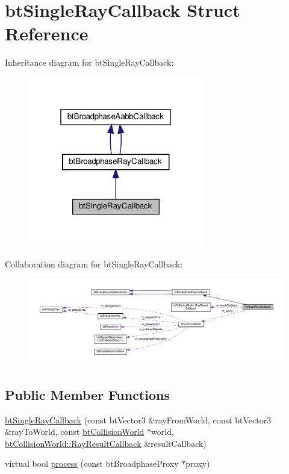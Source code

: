 \hypertarget{structbtSingleRayCallback}{}\section{bt\+Single\+Ray\+Callback Struct Reference}
\label{structbtSingleRayCallback}


Inheritance diagram for bt\+Single\+Ray\+Callback\+:
\nopagebreak
\begin{figure}[H]
\begin{center}
\leavevmode
\includegraphics[width=217pt]{structbtSingleRayCallback__inherit__graph}
\end{center}
\end{figure}


Collaboration diagram for bt\+Single\+Ray\+Callback\+:
\nopagebreak
\begin{figure}[H]
\begin{center}
\leavevmode
\includegraphics[width=350pt]{structbtSingleRayCallback__coll__graph}
\end{center}
\end{figure}
\subsection*{Public Member Functions}
\begin{DoxyCompactItemize}
\item 
\hyperlink{structbtSingleRayCallback_a5d29d3242de87c3f298dd3d924bd24fd}{bt\+Single\+Ray\+Callback} (const bt\+Vector3 \&ray\+From\+World, const bt\+Vector3 \&ray\+To\+World, const \hyperlink{classbtCollisionWorld}{bt\+Collision\+World} $\ast$world, \hyperlink{structbtCollisionWorld_1_1RayResultCallback}{bt\+Collision\+World\+::\+Ray\+Result\+Callback} \&result\+Callback)
\item 
virtual bool \hyperlink{structbtSingleRayCallback_a4e0dc3a4a2d92c6a838895c9add2a5c2}{process} (const bt\+Broadphase\+Proxy $\ast$proxy)
\end{DoxyCompactItemize}
